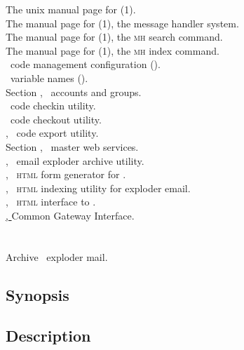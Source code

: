 The unix manual page for (1).\\
The manual page for (1), the message handler system.\\
The manual page for (1), the \textsc{mh} search command.\\
The manual page for (1), the \textsc{mh} index command.\\
\aipspp\ code management configuration ().\\
\aipspp\ variable names ().\\
Section , \aipspp\ accounts and groups.\\
 \aipspp\ code checkin utility.\\
 \aipspp\ code checkout utility.\\
, \aipspp\ code export utility.\\
Section , \aipspp\ master web services.\\
, \aipspp\ email exploder archive utility.\\
, \aipspp\ \textsc{html} form generator for .\\
, \aipspp\ \textsc{html} indexing utility for exploder email.\\
, \aipspp\ \textsc{html} interface to .\\
\href{http://hoohoo.ncsa.uiuc.edu/cgi}{, }{Common Gateway Interface}.


\newpage
\section{}
\label{aipsmail}

Archive \aipspp\ exploder mail.

\subsection*{Synopsis}

\begin{synopsis}
\end{synopsis}

\subsection*{Description}

